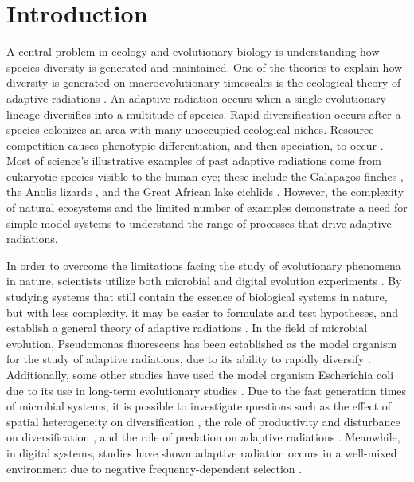 \documentclass[10pt]{article}
\begin{document}
\section{Introduction}
A central problem in ecology and evolutionary biology is understanding how species diversity is generated and maintained. One of the theories to explain how diversity is generated on macroevolutionary timescales is the ecological theory of adaptive radiations \cite{schluter2000ecology}. An adaptive radiation occurs when a single evolutionary lineage diversifies into a multitude of species. Rapid diversification occurs after a species colonizes an area with many unoccupied ecological niches. Resource competition causes phenotypic differentiation, and then speciation, to occur \cite{schluter2000ecology}. Most of science's illustrative examples of past adaptive radiations come from eukaryotic species visible to the human eye; these include the Galapagos finches \cite{grant2011and},
the Anolis lizards \cite{losos2009lizards}, and the Great African lake cichlids \cite{seehausen2006african}. However, the complexity of natural ecosystems and the limited number of examples demonstrate a need for simple model systems to understand the range of processes that drive adaptive radiations.

In order to overcome the limitations facing the study of evolutionary phenomena in nature, scientists utilize both microbial and digital evolution experiments \cite{kawecki2012experimental}.
By studying systems that still contain the essence of biological systems in nature, but with less complexity, it may be easier to formulate and test hypotheses, and establish a general theory of adaptive radiations \cite{kassen2009toward}.
In the field of microbial evolution, Pseudomonas fluorescens has been established as the model organism for the study of adaptive radiations, due to its ability to rapidly diversify \cite{spiers2002adaptive}.
Additionally, some other studies have used the model organism Escherichia coli due to its use in long-term evolutionary studies \cite{rosenzweig1994microbial,friesen2004experimental,le2012ecological}.
Due to the fast generation times of microbial systems, it is possible to investigate questions such as the effect of spatial heterogeneity on diversification \cite{rainey1998adaptive}, the role of productivity and disturbance on diversification \cite{kassen2000diversity,buckling2000disturbance,kassen2004ecological}, and the role of predation on adaptive radiations \cite{meyer2007effects}.
Meanwhile, in digital systems, studies have shown adaptive radiation occurs in a well-mixed environment due to negative frequency-dependent selection \cite{chow2004adaptive}.
\end{document}
